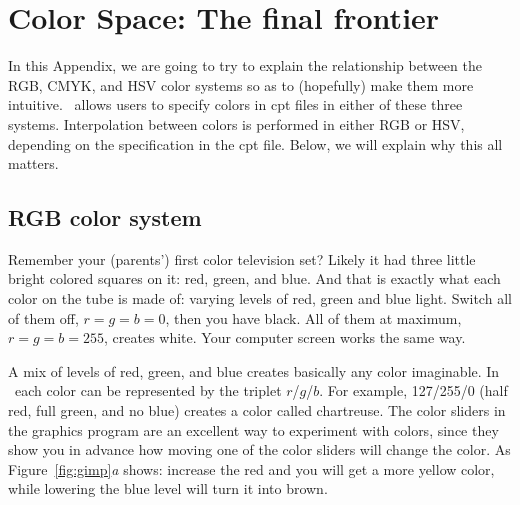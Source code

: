 %
%
\chapter{Color Space: The final frontier}
\label{app:I}
\thispagestyle{headings}


In this Appendix, we are going to try to explain the relationship
between the RGB, CMYK, and HSV color systems so as to (hopefully) make
them more intuitive.  \GMT\ allows users to specify colors in cpt
files in either of these three systems. Interpolation between colors is performed in either RGB or HSV, depending on the specification in the cpt file. Below, we will explain why this all matters.

\section{RGB color system}
Remember your (parents') first color television set? Likely it had three little bright colored squares on it: red, green, and blue. And that is exactly what each color on the tube is made of: varying levels of red, green and blue light. Switch all of them off, $r=g=b=0$, then you have black. All of them at maximum, $r=g=b=255$, creates white. Your computer screen works the same way.

A mix of levels of red, green, and blue creates basically any color imaginable. In \GMT\ each color can be represented by the triplet $r$/$g$/$b$. For example, 127/255/0 (half red, full green, and no blue) creates a color called chartreuse. The color sliders in the graphics program  are an excellent way to experiment with colors, since they show you in advance how moving one of the color sliders will change the color. As Figure~\ref{fig:gimp}\emph{a} shows: increase the red and you will get a more yellow color, while lowering the blue level will turn it into brown.

